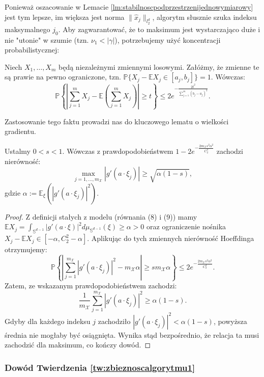 Ponieważ oszacowanie w Lemacie \ref{lm:stabilnoscpodprzestrzenijednowymiarowy} jest tym lepsze, im większa jest norma $\|\hat{x}_j\|_{l_2^d}$, algorytm słusznie szuka indeksu maksymalnego $j_0$. Aby zagwarantować, że to maksimum jest wystarczająco duże i nie "utonie" w szumie (tzn. $\nu_1 < |\gamma|$), potrzebujemy użyć koncentracji probabilistycznej:

\begin{tw}\label{tw:nierownoschoeffdinga}
Niech $X_1, \dots, X_m$ będą niezależnymi zmiennymi losowymi. Załóżmy, że zmienne te są prawie na pewno ograniczone, tzn. $\mathbb{P}\{X_j - \mathbb{E}X_j \in [a_j, b_j]\} = 1$. Wówczas:
$$\mathbb{P}\left\{\left|\sum_{j=1}^m X_j - \mathbb{E}\left(\sum_{j=1}^m X_j\right)\right| \ge t\right\} \le 2e^{-\frac{2t^2}{\sum_{j=1}^m (b_j - a_j)^2}}.$$ 
\end{tw}

Zastosowanie tego faktu prowadzi nas do kluczowego lematu o wielkości gradientu.

\begin{lm}\label{lm:wielkoscgradientu}
Ustalmy $0 < s < 1$. Wówczas z prawdopodobieństwem $1 - 2e^{-\frac{2m_\mathcal{X} s^2 \alpha^2}{C_2^4}}$ zachodzi nierówność:
$$\max_{j=1,\dots,m_\mathcal{X}} |g'(a \cdot \xi_j)| \ge \sqrt{\alpha(1-s)},$$ 
gdzie $\alpha := \mathbb{E}_\xi(|g'(a \cdot \xi_j)|^2)$.
\end{lm}

\begin{proof}
Z definicji stałych z modelu (równania (8) i (9)) mamy $\mathbb{E}X_j = \int_{\mathbb{S}^{d-1}} |g'(a \cdot \xi)|^2 d\mu_{\mathbb{S}^{d-1}}(\xi) \ge \alpha > 0$  oraz ograniczenie nośnika $X_j - \mathbb{E}X_j \in [-\alpha, C_2^2 - \alpha]$. Aplikując do tych zmiennych nierówność Hoeffdinga otrzymujemy:
$$\mathbb{P}\left\{\left| \sum_{j=1}^{m_\mathcal{X}} |g'(a \cdot \xi_j)|^2 - m_\mathcal{X} \alpha \right| \ge s m_\mathcal{X} \alpha\right\} \le 2e^{-\frac{2m_\mathcal{X} s^2 \alpha^2}{C_2^4}}.$$ 
Zatem, ze wskazanym prawdopodobieństwem zachodzi:
$$\frac{1}{m_\mathcal{X}} \sum_{j=1}^{m_\mathcal{X}} |g'(a \cdot \xi_j)|^2 \ge \alpha(1-s).$$ 
Gdyby dla każdego indeksu $j$ zachodziło $|g'(a \cdot \xi_j)|^2 < \alpha(1-s)$, powyższa średnia nie mogłaby być osiągnięta. Wynika stąd bezpośrednio, że relacja ta musi zachodzić dla maksimum, co kończy dowód. 
\end{proof}

\subsubsection{Dowód Twierdzenia \ref{tw:zbieznoscalgorytmu1}}

